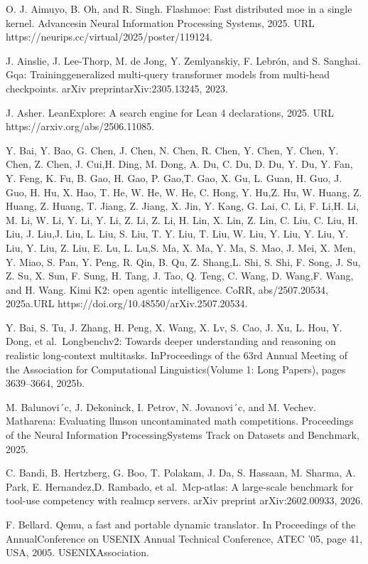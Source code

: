 \documentclass[
  10
]{article}
\begin{document}
O. J. Aimuyo, B. Oh, and R. Singh. Flashmoe: Fast distributed moe in a
single kernel. Advancesin Neural Information Processing Systems, 2025.
URL https://neurips.cc/virtual/2025/poster/119124.

J. Ainslie, J. Lee-Thorp, M. de Jong, Y. Zemlyanskiy, F. Lebrón, and S.
Sanghai. Gqa: Traininggeneralized multi-query transformer models from
multi-head checkpoints. arXiv preprintarXiv:2305.13245, 2023.

J. Asher. LeanExplore: A search engine for Lean 4 declarations, 2025.
URL https://arxiv.org/abs/2506.11085.

Y. Bai, Y. Bao, G. Chen, J. Chen, N. Chen, R. Chen, Y. Chen, Y. Chen, Y.
Chen, Z. Chen, J. Cui,H. Ding, M. Dong, A. Du, C. Du, D. Du, Y. Du, Y.
Fan, Y. Feng, K. Fu, B. Gao, H. Gao, P. Gao,T. Gao, X. Gu, L. Guan, H.
Guo, J. Guo, H. Hu, X. Hao, T. He, W. He, W. He, C. Hong, Y. Hu,Z. Hu,
W. Huang, Z. Huang, Z. Huang, T. Jiang, Z. Jiang, X. Jin, Y. Kang, G.
Lai, C. Li, F. Li,H. Li, M. Li, W. Li, Y. Li, Y. Li, Z. Li, Z. Li, H.
Lin, X. Lin, Z. Lin, C. Liu, C. Liu, H. Liu, J. Liu,J. Liu, L. Liu, S.
Liu, T. Y. Liu, T. Liu, W. Liu, Y. Liu, Y. Liu, Y. Liu, Y. Liu, Z. Liu,
E. Lu, L. Lu,S. Ma, X. Ma, Y. Ma, S. Mao, J. Mei, X. Men, Y. Miao, S.
Pan, Y. Peng, R. Qin, B. Qu, Z. Shang,L. Shi, S. Shi, F. Song, J. Su, Z.
Su, X. Sun, F. Sung, H. Tang, J. Tao, Q. Teng, C. Wang, D. Wang,F. Wang,
and H. Wang. Kimi K2: open agentic intelligence. CoRR, abs/2507.20534,
2025a.URL https://doi.org/10.48550/arXiv.2507.20534.

Y. Bai, S. Tu, J. Zhang, H. Peng, X. Wang, X. Lv, S. Cao, J. Xu, L. Hou,
Y. Dong, et al.~Longbenchv2: Towards deeper understanding and reasoning
on realistic long-context multitasks. InProceedings of the 63rd Annual
Meeting of the Association for Computational Linguistics(Volume 1: Long
Papers), pages 3639--3664, 2025b.

M. Balunovi´c, J. Dekoninck, I. Petrov, N. Jovanovi´c, and M. Vechev.
Matharena: Evaluating llmson uncontaminated math competitions.
Proceedings of the Neural Information ProcessingSystems Track on
Datasets and Benchmark, 2025.

C. Bandi, B. Hertzberg, G. Boo, T. Polakam, J. Da, S. Hassaan, M.
Sharma, A. Park, E. Hernandez,D. Rambado, et al.~Mcp-atlas: A
large-scale benchmark for tool-use competency with realmcp servers.
arXiv preprint arXiv:2602.00933, 2026.

F. Bellard. Qemu, a fast and portable dynamic translator. In Proceedings
of the AnnualConference on USENIX Annual Technical Conference, ATEC '05,
page 41, USA, 2005. USENIXAssociation.
\end{document}
